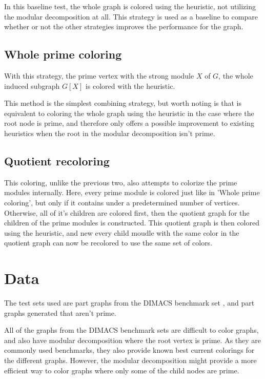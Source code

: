 \documentclass{amsart}
\begin{document}
In this baseline test, the whole graph is colored using the heuristic, not
utilizing the modular decomposition at all. This strategy is used as a baseline
to compare whether or not the other strategies improves the performance for the
graph.

\subsection{Whole prime coloring}

With this strategy, the prime vertex with the strong module $X$ of $G$, the
whole induced subgraph $G[X]$ is colored with the heuristic.

This method is the simplest combining strategy, but worth noting is that is
equivalent to coloring the whole graph using the heuristic in the case where the
root node is prime, and therefore only offers a possible improvement to existing
heuristics when the root in the modular decomposition isn't prime.

\subsection{Quotient recoloring}

This coloring, unlike the previous two, also attempts to colorize the prime
modules internally. Here, every prime module is colored just like in 'Whole
prime coloring', but only if it contains under a predetermined number of
vertices. Otherwise, all of it's children are colored first, then the quotient
graph for the children of the prime modules is constructed. This quotient graph
is then colored using the heuristic, and new every child moudle with the same
color in the quotient graph can now be recolored to use the same set of colors.


\section{Data}
\label{sec:Data}

The test sets used are part graphs from the DIMACS benchmark set \cite{DIMACS}, 
and part graphs generated that aren't prime.

All of the graphs from the DIMACS benchmark sets are difficult to color graphs,
and also have modular decomposition where the root vertex is prime. As they are
commonly used benchmarks, they also provide known best current colorings for the
different graphs. However, the modular decomposition might provide a more
efficient way to color graphs where only some of the child nodes are prime. 
\end{document}
